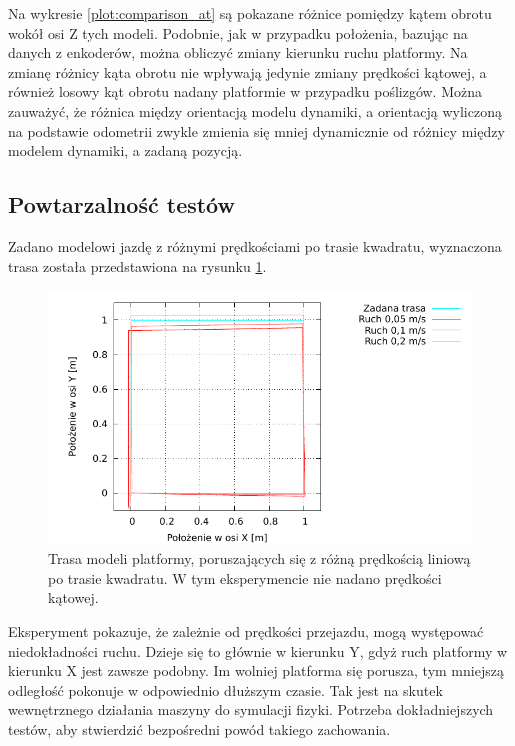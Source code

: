 			Na wykresie \ref{plot:comparison_at} są pokazane różnice pomiędzy kątem obrotu wokół osi Z tych modeli.
			Podobnie, jak w przypadku położenia, bazując na danych z enkoderów, można obliczyć zmiany kierunku ruchu platformy.
			Na zmianę różnicy kąta obrotu nie wpływają jedynie zmiany prędkości kątowej, a również losowy kąt obrotu nadany platformie w przypadku poślizgów.
			Można zauważyć, że różnica między orientacją modelu dynamiki, a orientacją wyliczoną na podstawie odometrii zwykle zmienia się mniej dynamicznie od 
			różnicy między modelem dynamiki, a zadaną pozycją.
			
	\subsection{Powtarzalność testów}
		Zadano modelowi jazdę z różnymi prędkościami po trasie kwadratu, wyznaczona trasa została przedstawiona na rysunku \ref{plot:repetitions_xy}.
		
		\begin{figure}[H]
			\centering
			\includegraphics[width=\textwidth]{plots/repetitions_xy.pdf}
				\caption{Trasa modeli platformy, poruszających się z różną prędkością liniową po trasie kwadratu. W tym eksperymencie nie nadano prędkości kątowej.}
			\label{plot:repetitions_xy}
		\end{figure}
		
		Eksperyment pokazuje, że zależnie od prędkości przejazdu, mogą występować niedokładności ruchu. Dzieje się to głównie w kierunku Y, gdyż ruch
		platformy w kierunku X jest zawsze podobny. Im wolniej platforma się porusza, tym mniejszą odległość pokonuje w odpowiednio dłuższym czasie. 
		Tak jest na skutek wewnętrznego działania maszyny do symulacji fizyki. Potrzeba dokładniejszych testów, aby stwierdzić bezpośredni powód takiego zachowania.
		
